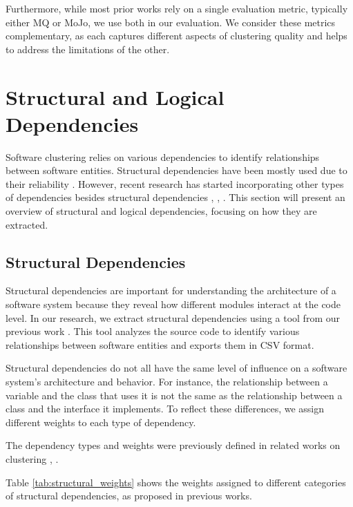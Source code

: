 \documentclass{ieeeaccess}
\begin{document}
Furthermore, while most prior works rely on a single evaluation metric, typically either MQ or MoJo, we use both in our evaluation. We consider these metrics complementary, as each captures different aspects of clustering quality and helps to address the limitations of the other.



\section{Structural and Logical Dependencies}
\label{sec:dependencies}

Software clustering relies on various dependencies to identify relationships between software entities. Structural dependencies have been mostly used due to their reliability \cite{b12}. However, recent research has started incorporating other types of dependencies besides structural dependencies \cite{b13}, \cite{b14}, \cite{b18}. This section will present an overview of structural and logical dependencies, focusing on how they are extracted.

\subsection{Structural Dependencies}

Structural dependencies are important for understanding the architecture of a software system because they reveal how different modules interact at the code level. In our research, we extract structural dependencies using a tool from our previous work \cite{b4}. This tool analyzes the source code to identify various relationships between software entities and exports them in CSV format.

Structural dependencies do not all have the same level of influence on a software system’s architecture and behavior. For instance, the relationship between a variable and the class that uses it is not the same as the relationship between a class and the interface it implements. To reflect these differences, we assign different weights to each type of dependency.

The dependency types and weights were previously defined in related works on clustering \cite{b19}, \cite{b20}.

Table \ref{tab:structural_weights} shows the weights assigned to different categories of structural dependencies, as proposed in previous works.
\end{document}

